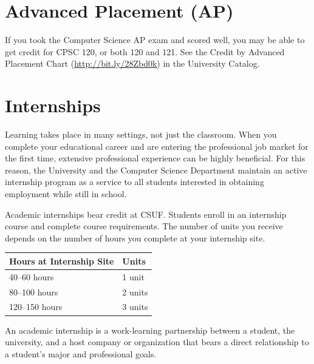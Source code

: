 \documentclass{book}
\newcommand{\CampusName}{CSUF}
\begin{document}
\section{Advanced Placement (AP)}
\label{section:ap}
If you took the Computer Science AP exam and scored well, you may be able to get credit for CPSC 120, or both 120 and 121. See the Credit by Advanced Placement Chart (\url{http://bit.ly/28Zbd0k}) in the University Catalog.

\section{Internships}

Learning takes place in many settings, not just the classroom. When you complete your educational career and are entering the professional job market for the first time, extensive professional experience can be highly beneficial. For this reason, the University and the Computer Science Department maintain an active internship program as a service to all students interested in obtaining employment while still in school.

Academic internships bear credit at \CampusName. Students enroll in an internship course and complete course requirements. The number of units you receive depends on the number of hours you complete at your internship site.

\begin{center}
\begin{tabular}{|l|l|} \hline
  \textbf{Hours at Internship Site} & \textbf{Units} \\ \hline
  40--60 hours & 1 unit \\ \hline
  80--100 hours & 2 units \\ \hline
  120--150 hours & 3 units \\ \hline
\end{tabular}
\end{center}

An academic internship is a work-learning partnership between a student, the university, and a host company or organization that bears a direct relationship to a student’s major and professional goals.
\end{document}
